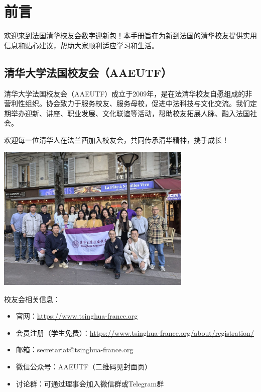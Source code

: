 \section*{前言}

欢迎来到法国清华校友会数字迎新包！本手册旨在为新到法国的清华校友提供实用信息和贴心建议，帮助大家顺利适应学习和生活。

\subsection{清华大学法国校友会（AAEUTF）}

清华大学法国校友会（AAEUTF）成立于2009年，是在法清华校友自愿组成的非营利性组织。协会致力于服务校友、服务母校，促进中法科技与文化交流。我们定期举办迎新、讲座、职业发展、文化联谊等活动，帮助校友拓展人脉、融入法国社会。

欢迎每一位清华人在法兰西加入校友会，共同传承清华精神，携手成长！

\begin{center}
\includegraphics[width=0.7\textwidth]{images/cover.jpg}
\end{center}

校友会相关信息：
\begin{itemize}
    \item 官网：\href{https://www.tsinghua-france.org}{https://www.tsinghua-france.org}
    \item 会员注册（学生免费）：\href{https://www.tsinghua-france.org/about/registration/}{https://www.tsinghua-france.org/about/registration/}
    \item 邮箱：secretariat@tsinghua-france.org
    \item 微信公众号：AAEUTF（二维码见封面页）
    \item 讨论群：可通过理事会加入微信群或Telegram群
\end{itemize}
